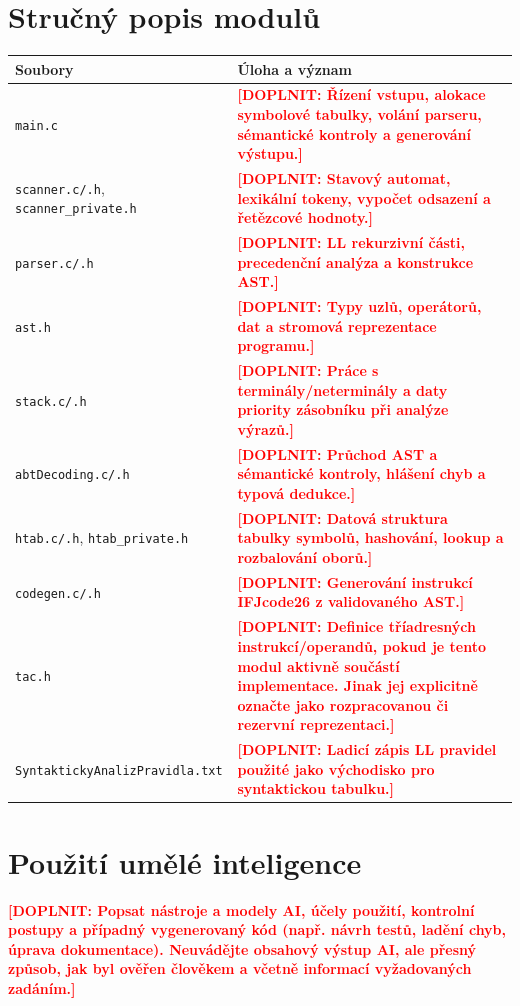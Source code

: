 \documentclass[11pt,a4paper]{article}
\newcommand{\placeholder}[1]{\textcolor{red}{\textbf{[DOPLNIT: #1]}}}
\begin{document}
\section{Stručný popis modulů}
\begin{longtable}{p{3.4cm}p{11.2cm}}
\toprule
Soubory & Úloha a význam \\
\midrule
\texttt{main.c} & \placeholder{Řízení vstupu, alokace symbolové tabulky, volání parseru, sémantické kontroly a generování výstupu.} \\
\texttt{scanner.c/.h}, \texttt{scanner\_private.h} & \placeholder{Stavový automat, lexikální tokeny, vypočet odsazení a řetězcové hodnoty.} \\
\texttt{parser.c/.h} & \placeholder{LL rekurzivní části, precedenční analýza a konstrukce AST.} \\
\texttt{ast.h} & \placeholder{Typy uzlů, operátorů, dat a stromová reprezentace programu.} \\
\texttt{stack.c/.h} & \placeholder{Práce s terminály/neterminály a daty priority zásobníku při analýze výrazů.} \\
\texttt{abtDecoding.c/.h} & \placeholder{Průchod AST a sémantické kontroly, hlášení chyb a typová dedukce.} \\
\texttt{htab.c/.h}, \texttt{htab\_private.h} & \placeholder{Datová struktura tabulky symbolů, hashování, lookup a rozbalování oborů.} \\
\texttt{codegen.c/.h} & \placeholder{Generování instrukcí IFJcode26 z validovaného AST.} \\
\texttt{tac.h} & \placeholder{Definice tříadresných instrukcí/operandů, pokud je tento modul aktivně součástí implementace. Jinak jej explicitně označte jako rozpracovanou či rezervní reprezentaci.} \\
\texttt{SyntaktickyAnalizPravidla.txt} & \placeholder{Ladicí zápis LL pravidel použité jako východisko pro syntaktickou tabulku.} \\
\bottomrule
\end{longtable}

\section{Použití umělé inteligence}
\placeholder{Popsat nástroje a modely AI, účely použití, kontrolní postupy a případný vygenerovaný kód
(např. návrh testů, ladění chyb, úprava dokumentace). Neuvádějte obsahový výstup AI, ale přesný způsob,
jak byl ověřen člověkem a včetně informací vyžadovaných zadáním.}
\end{document}
